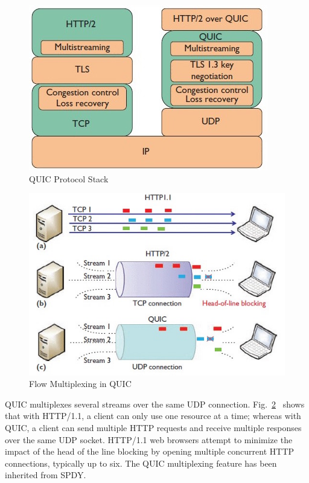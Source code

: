 \begin{figure}[!ht]
    \centering
    \includegraphics[width=0.6\linewidth]{img/quic/quic-protocolstack}
    \caption{QUIC Protocol Stack}
    \label{fig:quic-protocolstack}
\end{figure}

\begin{figure}[!ht]
    \centering
    \includegraphics[width=.8\textwidth]{img/quic/transmission_compare}
    \caption{Flow Multiplexing in QUIC~\cite{carlucci2015http}}
    \label{fig:Quic1}
\end{figure}

QUIC multiplexes several streams over the same UDP connection. Fig.~\ref{fig:Quic1}~\cite{carlucci2015http} shows that with HTTP/1.1, a client can only use one resource at a time; whereas with QUIC, a client can send multiple HTTP requests and receive multiple responses over the same UDP socket. HTTP/1.1 web browsers attempt to minimize the impact of the head of the line blocking by opening multiple concurrent HTTP connections, typically up to
six. The QUIC multiplexing feature has been inherited from SPDY.


